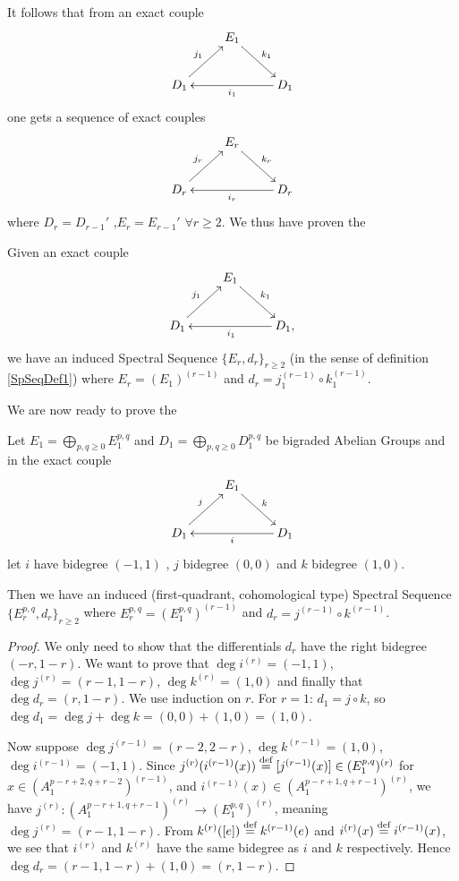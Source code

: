 \documentclass[../main.tex]{subfiles}
\begin{document}
It follows that from an exact couple
\[
\xymatrix{
&E_1 \ar[rd]^{k_1}& \\
D_1\ar[ur]^{j_1}&& D_1\ar[ll]^{i_1} 
}
\]
one gets a sequence of exact couples 
\[
\xymatrix{
&E_r \ar[rd]^{k_r}& \\
D_r\ar[ur]^{j_r}&& D_r\ar[ll]^{i_r} 
}
\]
where $D_r = D_{r-1}'$ ,$E_r = E_{r-1}'$ $\forall r \geq 2$.
We thus have proven the 
\begin{theorem} \label{ThmexCouplesSpSeqnonGr}
    Given an exact couple
    \[
\xymatrix{
&E_1 \ar[rd]^{k_1}& \\
D_1\ar[ur]^{j_1}&& D_1,\ar[ll]^{i_1} 
}
\]
we have an induced Spectral Sequence $\{E_r,d_r\}_{r\geq 2}$ (in the sense of definition \ref{SpSeqDef1}) where $E_r = (E_1)^{(r-1)}$ 
and $d_r = j_1^{(r-1)} \circ k_1^{(r-1)} $.
\end{theorem}
We are now ready to prove the 
\begin{theorem} \label{ThmexCouplesSpSeq}
Let
 $ E_1   =  \bigoplus_{p,q \geq 0} E_1^{p,q}$ and
 $ D_1   =  \bigoplus_{p,q \geq 0} D_1^{p,q}  $
be bigraded Abelian Groups and in the exact couple
    \[
\xymatrix{
&E_1 \ar[rd]^{k}& \\
D_1\ar[ur]^{j}&& D_1\ar[ll]^{i} 
}
\]
let $i$ have bidegree $(-1,1)$ , $j$ bidegree $(0,0)$ and $k$ bidegree $(1,0)$.

Then we have an induced (first-quadrant, cohomological type) Spectral Sequence $\{E_r^{p,q},d_r\}_{r\geq 2}$ where $E_r^{p,q} = (E_1^{p,q})^{(r-1)}$ and $d_r = j^{(r-1)} \circ k^{(r-1)} $.
\end{theorem}
\begin{proof}
    We only need to show that the differentials $d_r$ have the right bidegree $(-r,1-r)$. We want to prove that $\deg i^{(r)} = (-1,1)$,  $\deg j^{(r)} = (r-1,1-r)$,  $\deg k^{(r)} = (1,0)$ and finally that $\deg d_{r} = (r,1-r)$. We use induction on $r$.   
    For $r=1$: $d_1=j \circ k$, so $\deg d_1 = \deg j +\deg k= (0,0)+(1,0)=(1,0)$. 
    
    Now suppose $\deg j^{(r-1)}=(r-2,2-r)$, $\deg k^{(r-1)}=(1,0)$, $\deg i^{(r-1)}=(-1,1)$. Since $j^{(r)}(i^{(r-1)}(x)) \stackrel{\text{def}}{=} [j^{(r-1)}(x)] \in (E_1^{p,q})^{(r)}$ for $x \in (A_1^{p-r+2,q+r-2})^{(r-1)}$, and $i^{(r-1)}(x) \in (A_1^{p-r+1,q+r-1})^{(r)} $, we have $j^{(r)} \colon (A_1^{p-r+1,q+r-1})^{(r)}  \to (E_1^{p,q})^{(r)} $, meaning $\deg j^{(r)} = (r-1,1-r)$. From $k^{(r)}([e]) \stackrel{\text{def}}{=} k^{(r-1)}(e) $ and $i^{(r)}(x) \stackrel{\text{def}}{=} i^{(r-1)}(x)$, we see that $i^{(r)}$ and $k^{(r)}$ have the same bidegree as $i$ and $k$ respectively. Hence $\deg d_r = (r-1,1-r) +(1,0) = (r,1-r)$.
\end{proof}
\end{document}
